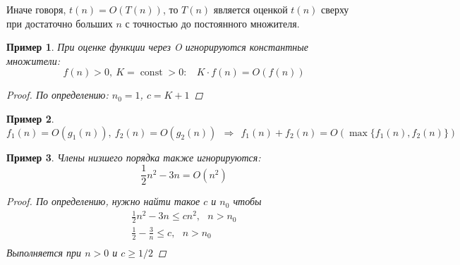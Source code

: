 \documentclass[12pt,a4paper]{report}
\def\const{\mathop{\mathrm{const}}\nolimits}
\newtheorem*{example}{Пример}
\begin{document}
Иначе говоря, $t(n)=O(T(n))$, то $T(n)$ является оценкой $t(n)$ сверху при достаточно больших $n$ с точностью до постоянного множителя.



\begin{example}
При оценке функции через O игнорируются константные множители:
$$
f(n) > 0,~ K=\const>0: ~~~~ K \cdot f(n) = O(f(n))
$$
\begin{proof}По определению: $n_0=1$, $c=K+1$\end{proof}
\end{example}


\begin{example}
$$
f_1(n) = O(g_1(n)),~ f_2(n) = O(g_2(n)) ~~\Rightarrow~~ f_1(n) + f_2(n) = O(\max\{f_1(n), f_2(n)\})
$$
\end{example}


\begin{example}
Члены низшего порядка также игнорируются:
$$
\frac{1}{2}n^2 - 3n = O(n^2)
$$
\begin{proof}По определению, нужно найти такое $c$ и $n_0$ чтобы
$$
\begin{gathered}
\frac{1}{2}n^2 - 3n \leqslant c n^2,~~~ n>n_0\\
\frac{1}{2} - \frac{3}{n} \leqslant c,~~~ n>n_0\\
\end{gathered}
$$
Выполняется при $n>0$ и $c \geqslant 1/2$
\end{proof}
\end{example}

\end{document}
